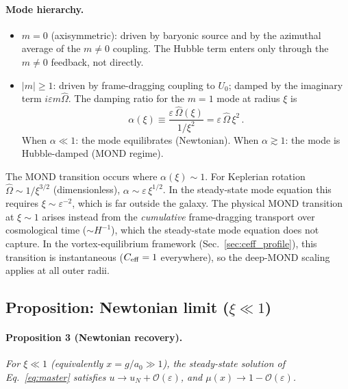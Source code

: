\documentclass[11pt]{article}
\begin{document}
\paragraph{Mode hierarchy.}
\begin{itemize}
\item $m = 0$ (axisymmetric): driven by baryonic source and
  by the azimuthal average of the $m \neq 0$ coupling.
  The Hubble term enters only through the $m \neq 0$
  feedback, not directly.
\item $|m| \geq 1$: driven by frame-dragging coupling to
  $U_0$; damped by the imaginary term
  $i\varepsilon m\hat\Omega$.  The damping ratio for the
  $m = 1$ mode at radius $\xi$ is
  \begin{equation}
  \alpha(\xi) \equiv
    \frac{\varepsilon\,\hat\Omega(\xi)}{1/\xi^{2}}
  = \varepsilon\,\hat\Omega\,\xi^{2}\,.
  \label{eq:alpha}
  \end{equation}
  When $\alpha \ll 1$: the mode equilibrates (Newtonian).
  When $\alpha \gtrsim 1$: the mode is Hubble-damped
  (MOND regime).
\end{itemize}

The MOND transition occurs where $\alpha(\xi) \sim 1$.
For Keplerian rotation $\hat\Omega \sim 1/\xi^{3/2}$
(dimensionless), $\alpha \sim \varepsilon\,\xi^{1/2}$.
In the steady-state mode equation this requires
$\xi \sim \varepsilon^{-2}$, which is far outside the
galaxy.  The physical MOND transition at $\xi \sim 1$
arises instead from the \emph{cumulative} frame-dragging
transport over cosmological time ($\sim H^{-1}$), which
the steady-state mode equation does not capture.
In the vortex-equilibrium framework
(Sec.~\ref{sec:ceff_profile}), this transition is
instantaneous ($C_{\rm eff}=1$ everywhere), so
the deep-MOND scaling applies at all outer radii.

\subsection[Proposition: Newtonian limit (xi much less than 1)]{Proposition: Newtonian limit ($\xi \ll 1$)}
\label{sec:newton_limit}

\paragraph{Proposition 3 (Newtonian recovery).}
\textit{For $\xi \ll 1$ (equivalently $x = g/a_0 \gg 1$),
the steady-state solution of
Eq.~\eqref{eq:master} satisfies
$u \to u_N + \mathcal{O}(\varepsilon)$,
and $\mu(x) \to 1 - \mathcal{O}(\varepsilon)$.}
\end{document}
